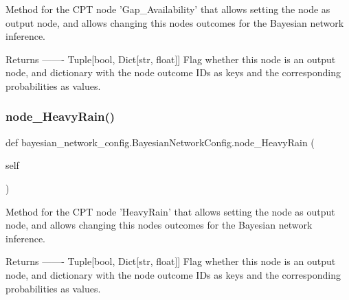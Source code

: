 \begin{DoxyVerb}Method for the CPT node 'Gap_Availability' that allows setting the node as output node, 
and allows changing this nodes outcomes for the Bayesian network inference.

Returns
-------
Tuple[bool, Dict[str, float]]
    Flag whether this node is an output node, and dictionary with the node outcome IDs as keys 
    and the corresponding probabilities as values.
\end{DoxyVerb}
 \mbox{\label{classbayesian__network__config_1_1_bayesian_network_config_a7e92e0763a594ce2d1ac0e6cf4ed6658}} 
\subsubsection{\texorpdfstring{node\+\_\+\+Heavy\+Rain()}{node\_HeavyRain()}\hspace{0.1cm}{\footnotesize\ttfamily [1/3]}}
{\footnotesize\ttfamily def bayesian\+\_\+network\+\_\+config.\+Bayesian\+Network\+Config.\+node\+\_\+\+Heavy\+Rain (\begin{DoxyParamCaption}\item[{}]{self }\end{DoxyParamCaption})}

\begin{DoxyVerb}Method for the CPT node 'HeavyRain' that allows setting the node as output node,
and allows changing this nodes outcomes for the Bayesian network inference.

Returns
-------
Tuple[bool, Dict[str, float]]
    Flag whether this node is an output node, and dictionary with the node outcome IDs as keys
    and the corresponding probabilities as values.
\end{DoxyVerb}
 \mbox{\label{classbayesian__network__config_1_1_bayesian_network_config_a7e92e0763a594ce2d1ac0e6cf4ed6658}} 
